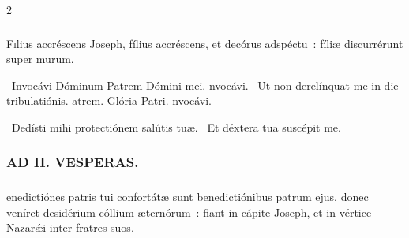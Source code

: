 \documentclass[9pt,twoside]{extarticle}
\begin{document}
\begin{multicols}{2}
{{\subsubsection*{}
\lettrine{F}ilius accréscens Joseph, fílius accréscens, et decórus adspéctu~: fíliæ discurrérunt super murum.

\begin{tightlist}{}
\item {}~Invocávi Dóminum \textred{*} Patrem Dómini mei. nvocávi. ~Ut non derelínquat me in die tribulatiónis. atrem. Glória Patri. nvocávi.
\item {}~Dedísti mihi protectiónem salútis tuæ. ~Et déxtera tua suscépit me.
\end{tightlist}

\subsubsection*{\center \textsc{AD II. VESPERAS.}}
\begin{tightlist}{}
\item {}
\end{tightlist}

\subsubsection*{}
enedictiónes patris tui confortátæ sunt benedictiónibus patrum ejus, donec veníret desidérium cóllium æternórum~: fiant in cápite Joseph, et in vértice Nazarǽi inter fratres suos.

}}
\end{multicols}
\end{document}
